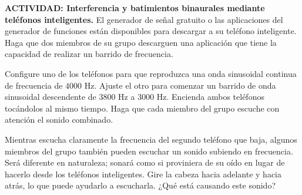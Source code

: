 \item \textbf{ACTIVIDAD: Interferencia y batimientos binaurales mediante teléfonos inteligentes.}
El generador de señal gratuito o las aplicaciones del generador de funciones están disponibles para descargar a su teléfono inteligente. Haga que dos miembros de su grupo descarguen una aplicación que tiene la capacidad de realizar un barrido de frecuencia.

Configure uno de los teléfonos para que reproduzca una onda sinusoidal continua de frecuencia de $4000\text{ Hz}$. Ajuste el otro para comenzar un barrido de onda sinusoidal descendente de $3800\text{ Hz}$ a $3000\text{ Hz}$. Encienda ambos teléfonos tocándolos al mismo tiempo. Haga que cada miembro del grupo escuche con atención el sonido combinado.

Mientras escucha claramente la frecuencia del segundo teléfono que baja, algunos miembros del grupo también pueden escuchar un sonido subiendo en frecuencia. Será diferente en naturaleza; sonará como si proviniera de su oído en lugar de hacerlo desde los teléfonos inteligentes. Gire la cabeza hacia adelante y hacia atrás, lo que puede ayudarlo a escucharla. ¿Qué está causando este sonido?
